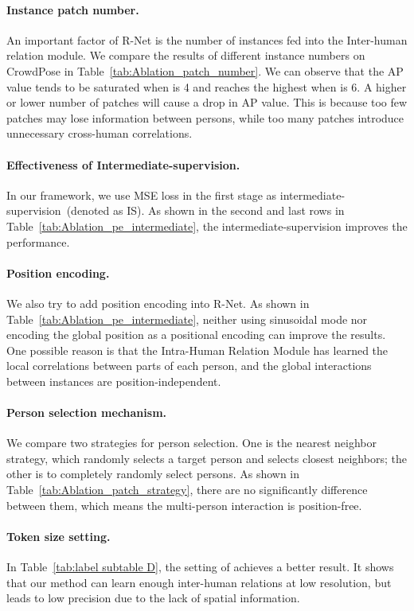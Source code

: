 \documentclass{article}
\begin{document}
\paragraph{Instance patch number.}
An important factor of R-Net is the number of instances fed into the Inter-human relation module. We compare the results of different instance numbers on CrowdPose in Table~\ref{tab:Ablation_patch_number}. We can observe that the AP value tends to be saturated when  is 4 and reaches the highest when  is 6. A higher or lower number of patches will cause a drop in AP value. This is because too few patches may lose information between persons, while too many patches introduce unnecessary cross-human correlations.

\paragraph{Effectiveness of Intermediate-supervision.} In our framework, we use MSE loss in the first stage as intermediate-supervision~(denoted as IS). As shown in the second and last rows in Table~\ref{tab:Ablation_pe_intermediate}, the intermediate-supervision improves the performance.

\paragraph{Position encoding.}\label{PE_ablation}
We also try to add position encoding into R-Net. As shown in Table~\ref{tab:Ablation_pe_intermediate}, neither using sinusoidal mode nor encoding the global position as a positional encoding can improve the results. One possible reason is that the Intra-Human Relation Module has learned the local correlations between parts of each person, and the global interactions between instances are position-independent.

\paragraph{Person selection mechanism.}\label{PatchExtractionStrategy} We compare two strategies for person selection. One is the nearest neighbor strategy, which randomly selects a target person and selects  closest neighbors; the other is to completely randomly select  persons. As shown in Table~\ref{tab:Ablation_patch_strategy}, there are no significantly difference between them, which means the multi-person interaction is position-free. 

\paragraph{Token size setting.} In Table~\ref{tab:label subtable D}, the setting of  achieves a better result. It shows that our method can learn enough inter-human relations at low resolution, but  leads to low precision due to the lack of spatial information.
\end{document}
